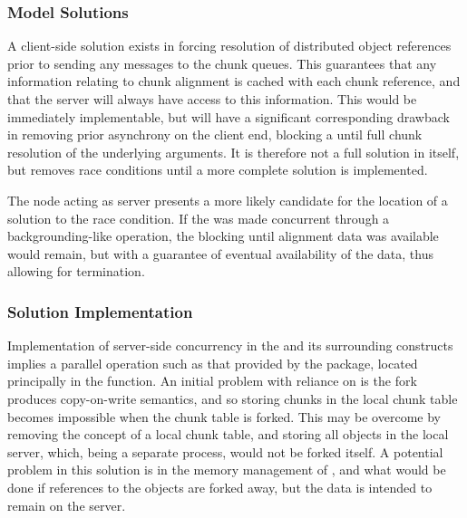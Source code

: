 
\subsubsection{Model Solutions}

A client-side solution exists in forcing resolution of distributed object references prior to sending any messages to the chunk queues.
This guarantees that any information relating to chunk alignment is cached with each chunk reference, and that the server will always have access to this information.
This would be immediately implementable, but will have a significant corresponding drawback in removing prior asynchrony on the client end, blocking a  until full chunk resolution of the underlying arguments.
It is therefore not a full solution in itself, but removes race conditions until a more complete solution is implemented.

The node acting as server presents a more likely candidate for the location of a solution to the race condition.
If the  was made concurrent through a backgrounding-like operation, the blocking until alignment data was available would remain, but with a guarantee of eventual availability of the data, thus allowing for termination.

\subsubsection{Solution Implementation}

Implementation of server-side concurrency in the  and its surrounding constructs implies a parallel operation such as that provided by the  package, located principally in the  function.
An initial problem with reliance on  is the fork produces copy-on-write semantics, and so storing chunks in the local chunk table becomes impossible when the chunk table is forked.
This may be overcome by removing the concept of a local chunk table, and storing all objects in the local  server, which, being a separate process, would not be forked itself.
A potential problem in this solution is in the memory management of , and what would be done if references to the \R{} objects are forked away, but the data is intended to remain on the server.

